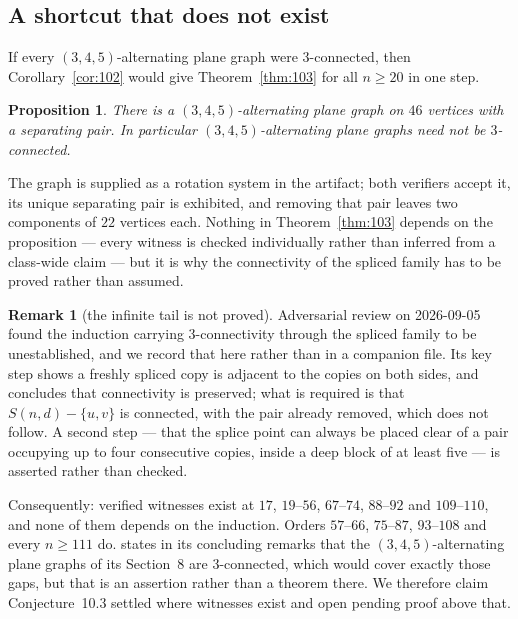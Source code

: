 \documentclass[11pt,a4paper]{amsart}
\theoremstyle{plain}
\newtheorem{proposition}[theorem]{Proposition}
\theoremstyle{definition}
\newtheorem{remark}[theorem]{Remark}
\begin{document}
\subsection{A shortcut that does not exist}

If every $(3,4,5)$-alternating plane graph were $3$-connected, then
Corollary~\ref{cor:102} would give Theorem~\ref{thm:103} for all $n \ge 20$ in
one step.

\begin{proposition}\label{prop:not3conn}
There is a $(3,4,5)$-alternating plane graph on $46$ vertices with a separating
pair. In particular $(3,4,5)$-alternating plane graphs need not be
$3$-connected.
\end{proposition}

The graph is supplied as a rotation system in the artifact; both verifiers
accept it, its unique separating pair is exhibited, and removing that pair
leaves two components of $22$ vertices each. Nothing in
Theorem~\ref{thm:103} depends on the proposition --- every witness is checked
individually rather than inferred from a class-wide claim --- but it is why the
connectivity of the spliced family has to be proved rather than assumed.


\begin{remark}[the infinite tail is not proved]\label{rem:103gap}
Adversarial review on 2026-09-05 found the induction carrying $3$-connectivity
through the spliced family to be unestablished, and we record that here rather
than in a companion file. Its key step shows a freshly spliced copy is adjacent
to the copies on both sides, and concludes that connectivity is preserved; what
is required is that $S(n,d) - \{u,v\}$ is connected, with the pair already
removed, which does not follow. A second step --- that the splice point can
always be placed clear of a pair occupying up to four consecutive copies, inside
a deep block of at least five --- is asserted rather than checked.

Consequently: verified witnesses exist at $17$, $19$--$56$, $67$--$74$,
$88$--$92$ and $109$--$110$, and none of them depends on the induction. Orders
$57$--$66$, $75$--$87$, $93$--$108$ and every $n \ge 111$ do. \cite{AHSSV2015}
states in its concluding remarks that the $(3,4,5)$-alternating plane graphs of
its Section~8 are $3$-connected, which would cover exactly those gaps, but that
is an assertion rather than a theorem there. We therefore claim Conjecture~10.3
settled where witnesses exist and open pending proof above that.
\end{remark}
\end{document}

